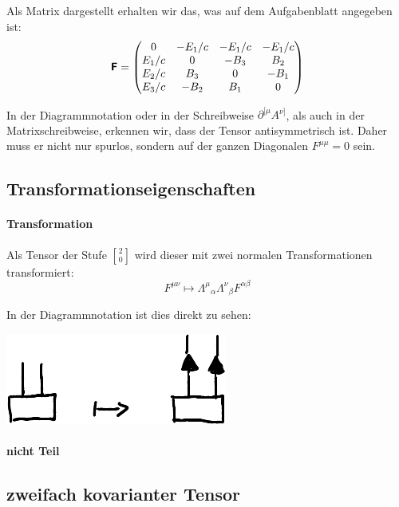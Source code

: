 Als Matrix dargestellt erhalten wir das, was auf dem Aufgabenblatt angegeben
ist:
\[
	\boldsymbol{\mathsf{F}}
	=
	\begin{pmatrix}
		0 & -E_1/c & -E_1/c & -E_1/c \\
		E_1/c & 0 & -B_3 & B_2 \\
		E_2/c & B_3 & 0 & -B_1 \\
		E_3/c & -B_2 & B_1 & 0 \\
	\end{pmatrix}
\]

In der Diagrammnotation oder in der Schreibweise $\partial^{[\mu} A^{\nu]}$, als
auch in der Matrixschreibweise, erkennen wir, dass der Tensor antisymmetrisch
ist. Daher muss er nicht nur spurlos, sondern auf der ganzen Diagonalen
$F^{\mu\mu} = 0$ sein.

\subsection{Transformationseigenschaften}

\paragraph{Transformation}

Als Tensor der Stufe ${2 \brack 0}$ wird dieser mit zwei normalen
Transformationen transformiert:
\[
	F^{\mu\nu} \mapsto \Lambda^\mu{}_\alpha \Lambda^\nu{}_\beta F^{\alpha\beta}
\]

In der Diagrammnotation ist dies direkt zu sehen:
\begin{center}
	\includegraphics{H1-Penrose-9-crop.pdf}
\end{center}

\paragraph{nicht Teil}

\fehlt

\subsection{zweifach kovarianter Tensor}


